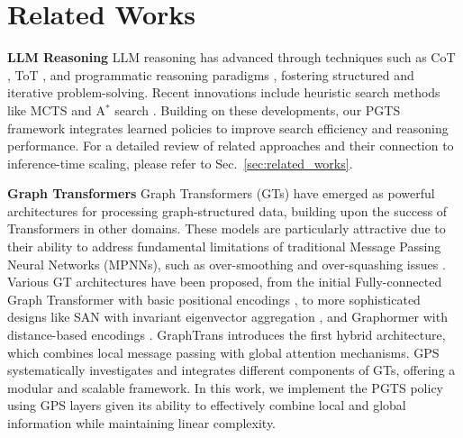 \section{Related Works}
\textbf{LLM Reasoning}\quad
LLM reasoning has advanced through techniques such as CoT \cite{wei2022chain}, ToT \cite{yao2024tree}, and programmatic reasoning paradigms \cite{chen2022program,sel2023algorithm}, fostering structured and iterative problem-solving. Recent innovations include heuristic search methods like MCTS \cite{feng2023alphazero,hao2023reasoning} and A$^*$ search \cite{wang2024q}. Building on these developments, our PGTS framework integrates learned policies to improve search efficiency and reasoning performance. For a detailed review of related approaches and their connection to inference-time scaling, please refer to Sec.~\ref{sec:related_works}.

\textbf{Graph Transformers}\quad
Graph Transformers (GTs) have emerged as powerful architectures for processing graph-structured data, building upon the success of Transformers in other domains. These models are particularly attractive due to their ability to address fundamental limitations of traditional Message Passing Neural Networks (MPNNs), such as over-smoothing and over-squashing issues \cite{alon2020bottleneck,topping2021understanding}. Various GT architectures have been proposed, from the initial Fully-connected Graph Transformer with basic positional encodings \cite{dwivedi2020generalization}, to more sophisticated designs like SAN with invariant eigenvector aggregation \cite{kreuzer2021rethinking}, and Graphormer with distance-based encodings \cite{ying2021transformers}. GraphTrans \cite{wu2021representing} introduces the first hybrid architecture, which combines local message passing with global attention mechanisms. GPS \cite{rampavsek2022recipe} systematically investigates and integrates different components of GTs, offering a modular and scalable framework. In this work, we implement the PGTS policy using GPS layers given its ability to effectively combine local and global information while maintaining linear complexity.

